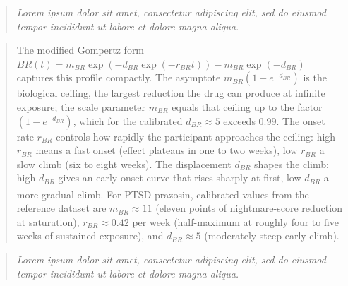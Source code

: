 \documentclass[
  11pt,
]{article}
\newenvironment{rgt}{%
  \begin{quote}\small\itshape\color[RGB]{20,60,160}}{%
  \end{quote}}
\newenvironment{orig}{%
  \begin{quote}\normalsize\color[gray]{0.55}}{%
  \end{quote}}
\begin{document}
\begin{rgt}
Lorem ipsum dolor sit amet, consectetur adipiscing elit, sed do eiusmod tempor incididunt ut labore et dolore magna aliqua.

\end{rgt}

\begin{orig}
The modified Gompertz form
\(BR(t) = m_{BR}\exp(-d_{BR}\exp(-r_{BR}t)) -
m_{BR}\exp(-d_{BR})\) captures this profile compactly. The
asymptote \(m_{BR}(1 - e^{-d_{BR}})\) is the biological ceiling,
the largest reduction the drug can produce at infinite exposure;
the scale parameter \(m_{BR}\) equals that ceiling up to the
factor \((1 - e^{-d_{BR}})\), which for the calibrated
\(d_{BR} \approx 5\) exceeds \(0.99\). The onset
rate \(r_{BR}\) controls how rapidly the participant approaches the
ceiling: high \(r_{BR}\) means a fast onset (effect plateaus in
one to two weeks), low \(r_{BR}\) a slow climb (six to eight
weeks). The displacement \(d_{BR}\) shapes the climb: high
\(d_{BR}\) gives an early-onset curve that rises sharply at first,
low \(d_{BR}\) a more gradual climb. For PTSD prazosin, calibrated
values from the\textsuperscript{} reference dataset are
\(m_{BR} \approx 11\) (eleven points of nightmare-score reduction
at saturation), \(r_{BR} \approx 0.42\) per week (half-maximum at
roughly four to five weeks of sustained exposure), and
\(d_{BR} \approx 5\) (moderately steep early climb).

\end{orig}

\begin{rgt}
Lorem ipsum dolor sit amet, consectetur adipiscing elit, sed do eiusmod tempor incididunt ut labore et dolore magna aliqua.

\end{rgt}
\end{document}

